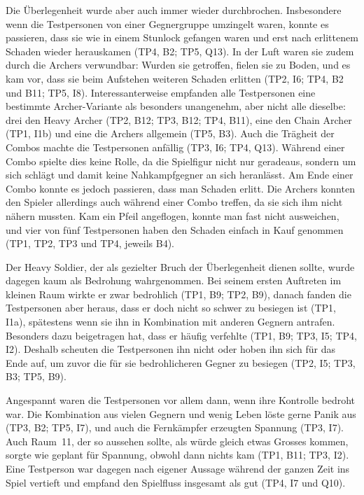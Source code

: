 \documentclass[../Main.tex]{subfiles}
\begin{document}
Die Überlegenheit wurde aber auch immer wieder durchbrochen. Insbesondere wenn die Testpersonen von einer Gegnergruppe umzingelt waren, konnte es passieren, dass sie wie in einem Stunlock gefangen waren und erst nach erlittenem Schaden wieder herauskamen (TP4, B2; TP5, Q13). In der Luft waren sie zudem durch die Archers verwundbar: Wurden sie getroffen, fielen sie zu Boden, und es kam vor, dass sie beim Aufstehen weiteren Schaden erlitten (TP2, I6; TP4, B2 und B11; TP5, I8). Interessanterweise empfanden alle Testpersonen eine bestimmte Archer-Variante als besonders unangenehm, aber nicht alle dieselbe: drei den Heavy Archer (TP2, B12; TP3, B12; TP4, B11), eine den Chain Archer (TP1, I1b) und eine die Archers allgemein (TP5, B3). Auch die Trägheit der Combos machte die Testpersonen anfällig (TP3, I6; TP4, Q13). Während einer Combo spielte dies keine Rolle, da die Spielfigur nicht nur geradeaus, sondern um sich schlägt und damit keine Nahkampfgegner an sich heranlässt. Am Ende einer Combo konnte es jedoch passieren, dass man Schaden erlitt. Die Archers konnten den Spieler allerdings auch während einer Combo treffen, da sie sich ihm nicht nähern mussten. Kam ein Pfeil angeflogen, konnte man fast nicht ausweichen, und vier von fünf Testpersonen haben den Schaden einfach in Kauf genommen (TP1, TP2, TP3 und TP4, jeweils B4).

Der Heavy Soldier, der als gezielter Bruch der Überlegenheit dienen sollte, wurde dagegen kaum als Bedrohung wahrgenommen. Bei seinem ersten Auftreten im kleinen Raum wirkte er zwar bedrohlich (TP1, B9; TP2, B9), danach fanden die Testpersonen aber heraus, dass er doch nicht so schwer zu besiegen ist (TP1, I1a), spätestens wenn sie ihn in Kombination mit anderen Gegnern antrafen. Besonders dazu beigetragen hat, dass er häufig verfehlte (TP1, B9; TP3, I5; TP4, I2). Deshalb scheuten die Testpersonen ihn nicht oder hoben ihn sich für das Ende auf, um zuvor die für sie bedrohlicheren Gegner zu besiegen (TP2, I5; TP3, B3; TP5, B9).

Angespannt waren die Testpersonen vor allem dann, wenn ihre Kontrolle bedroht war. Die Kombination aus vielen Gegnern und wenig Leben löste gerne Panik aus (TP3, B2; TP5, I7), und auch die Fernkämpfer erzeugten Spannung (TP3, I7). Auch Raum~11, der so aussehen sollte, als würde gleich etwas Grosses kommen, sorgte wie geplant für Spannung, obwohl dann nichts kam (TP1, B11; TP3, I2). Eine Testperson war dagegen nach eigener Aussage während der ganzen Zeit ins Spiel vertieft und empfand den Spielfluss insgesamt als gut (TP4, I7 und Q10).
\end{document}
